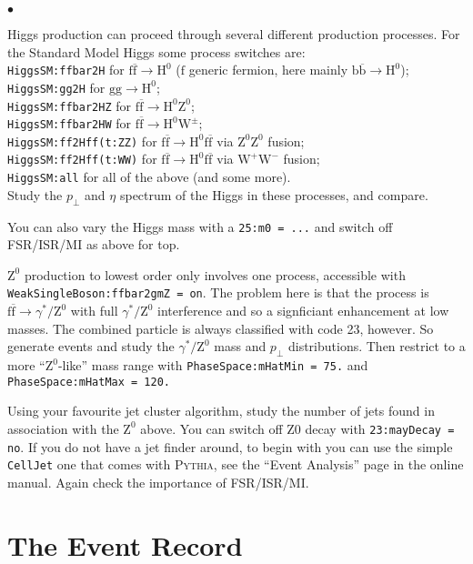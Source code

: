 \documentclass[12pt,a4paper]{article}
\newcommand{\pT}{p_{\perp}}
\renewcommand{\b}{{\mathrm b}}
\newcommand{\f}{{\mathrm f}}
\newcommand{\g}{{\mathrm g}}
\renewcommand{\H}{{\mathrm H}}
\newcommand{\W}{{\mathrm W}}
\newcommand{\Z}{{\mathrm Z}}
\newcommand{\bbar}{\overline{\mathrm b}}
\newcommand{\fbar}{\overline{\mathrm f}}
\newenvironment{Itemize}{\begin{list}{$\bullet$}%
{\setlength{\topsep}{0.4mm}\setlength{\partopsep}{0.4mm}%
\setlength{\itemsep}{0.4mm}\setlength{\parsep}{0.4mm}}}%
{\end{list}}
\begin{document}
\begin{Itemize}
\item Higgs production can proceed through several different 
production processes. For the Standard Model Higgs some process
switches are:\\
\texttt{HiggsSM:ffbar2H} for $\f \fbar \to \H^0$ 
($\f$ generic fermion, here mainly $\b \bbar \to \H^0$); \\ 
\texttt{HiggsSM:gg2H} for $\g \g \to \H^0$; \\ 
\texttt{HiggsSM:ffbar2HZ} for $\f \fbar \to \H^0 \Z^0$; \\ 
\texttt{HiggsSM:ffbar2HW} for $\f \fbar \to \H^0 \W^{\pm}$; \\ 
\texttt{HiggsSM:ff2Hff(t:ZZ)}  for $\f \fbar \to \H^0\f \fbar$
via $\Z^0\Z^0$ fusion; \\ 
\texttt{HiggsSM:ff2Hff(t:WW)}  for $\f \fbar \to \H^0\f \fbar$
via $\W^+\W^-$ fusion; \\ 
\texttt{HiggsSM:all} for all of the above (and some more). \\
Study the $\pT$ and $\eta$ spectrum of the Higgs in these processes,
and compare. 
\item You can also vary the Higgs mass with a \texttt{25:m0 = ...}
and switch off FSR/ISR/MI as above for top.
\item $\Z^0$ production to lowest order only involves one process,
accessible with \texttt{WeakSingleBoson:ffbar2gmZ = on}. The problem
here is that the process is $\f \fbar \to \gamma^*/\Z^0$ with full
$\gamma^*/\Z^0$ interference and so a signficiant enhancement at low
masses. The combined particle is always classified with code 23,
however. So generate events and study the $\gamma^*/\Z^0$ mass and
$\pT$ distributions. Then restrict to a more ``$\Z^0$-like''  
mass range with \texttt{PhaseSpace:mHatMin = 75.} and 
\texttt{PhaseSpace:mHatMax = 120.}
\item Using your favourite jet cluster algorithm, study the number 
of jets found in association with the $\Z^0$ above. You can switch 
off Z0 decay with \texttt{23:mayDecay = no}. If you do not have a jet 
finder around, to begin with you can use the simple \texttt{CellJet} 
one that comes with \textsc{Pythia}, see the ``Event Analysis'' page 
in the online manual. Again check the importance of FSR/ISR/MI. 
\end{Itemize}

\appendix
\section{The Event Record}
\end{document}
